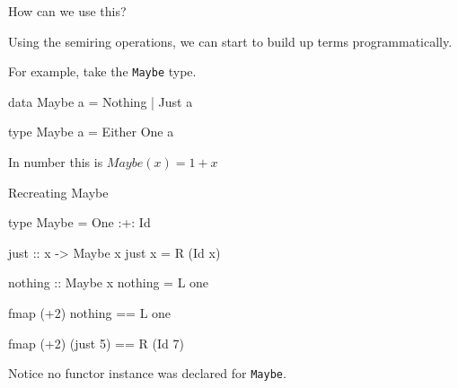 \documentclass[ignorenonframetext,]{beamer}
\begin{document}
\begin{frame}[fragile]{How can we use this?}

Using the semiring operations, we can start to build up terms
programmatically.

For example, take the \texttt{Maybe} type.

\begin{haskellcode}
data Maybe a = Nothing | Just a
\end{haskellcode}

\pause

\begin{haskellcode}
type Maybe a = Either One a
\end{haskellcode}

\pause

In number this is \(Maybe(x) = 1 + x\)

\end{frame}


\begin{frame}[fragile]{Recreating Maybe}

\begin{haskellcode}
type Maybe = One :+: Id

just :: x -> Maybe x
just x = R (Id x)

nothing :: Maybe x
nothing = L one
\end{haskellcode}

\pause

\begin{haskellcode}
fmap (+2) nothing == L one
\end{haskellcode}

\pause

\begin{haskellcode}
fmap (+2) (just 5) == R (Id 7)
\end{haskellcode}

Notice no functor instance was declared for \texttt{Maybe}.

\end{frame}
\end{document}
